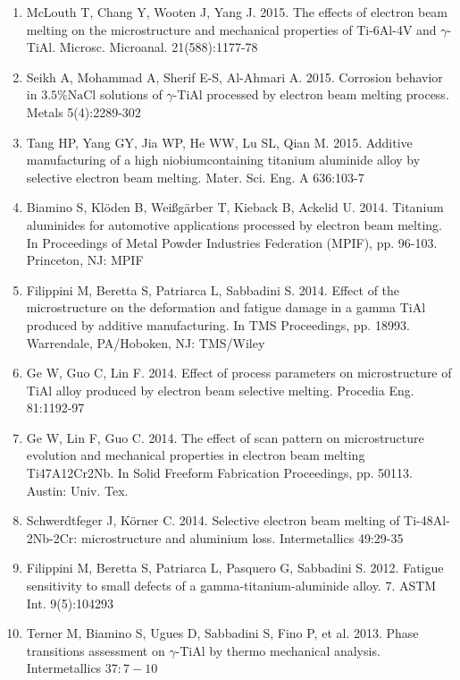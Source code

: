 \documentclass[10pt]{article}
\begin{document}
\begin{enumerate}
  \item McLouth T, Chang Y, Wooten J, Yang J. 2015. The effects of electron beam melting on the microstructure and mechanical properties of Ti-6Al-4V and $\gamma$-TiAl. Microsc. Microanal. 21(588):1177-78

  \item Seikh A, Mohammad A, Sherif E-S, Al-Ahmari A. 2015. Corrosion behavior in $3.5 \% \mathrm{NaCl}$ solutions of $\gamma$-TiAl processed by electron beam melting process. Metals 5(4):2289-302

  \item Tang HP, Yang GY, Jia WP, He WW, Lu SL, Qian M. 2015. Additive manufacturing of a high niobiumcontaining titanium aluminide alloy by selective electron beam melting. Mater. Sci. Eng. A 636:103-7

  \item Biamino S, Klöden B, Weißgärber T, Kieback B, Ackelid U. 2014. Titanium aluminides for automotive applications processed by electron beam melting. In Proceedings of Metal Powder Industries Federation (MPIF), pp. 96-103. Princeton, NJ: MPIF

  \item Filippini M, Beretta S, Patriarca L, Sabbadini S. 2014. Effect of the microstructure on the deformation and fatigue damage in a gamma TiAl produced by additive manufacturing. In TMS Proceedings, pp. 18993. Warrendale, PA/Hoboken, NJ: TMS/Wiley

  \item Ge W, Guo C, Lin F. 2014. Effect of process parameters on microstructure of TiAl alloy produced by electron beam selective melting. Procedia Eng. 81:1192-97

  \item Ge W, Lin F, Guo C. 2014. The effect of scan pattern on microstructure evolution and mechanical properties in electron beam melting Ti47A12Cr2Nb. In Solid Freeform Fabrication Proceedings, pp. 50113. Austin: Univ. Tex.

  \item Schwerdtfeger J, Körner C. 2014. Selective electron beam melting of Ti-48Al-2Nb-2Cr: microstructure and aluminium loss. Intermetallics 49:29-35

  \item Filippini M, Beretta S, Patriarca L, Pasquero G, Sabbadini S. 2012. Fatigue sensitivity to small defects of a gamma-titanium-aluminide alloy. 7. ASTM Int. 9(5):104293

  \item Terner M, Biamino S, Ugues D, Sabbadini S, Fino P, et al. 2013. Phase transitions assessment on $\gamma$-TiAl by thermo mechanical analysis. Intermetallics $37: 7-10$


\end{enumerate}
\end{document}
